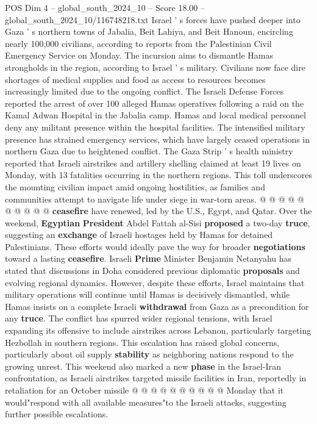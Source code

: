 \begin{textsample}{POS Dim 4 – global\_south\_2024\_10 – Score 18.00 – global\_south\_2024\_10/116748218.txt}  \label{ex:f4_pos_386}
Israel ' s forces have pushed deeper into Gaza ' s northern towns of Jabalia, Beit Lahiya, and Beit Hanoun, encircling nearly 100,000 civilians, according to reports from the Palestinian Civil Emergency Service on Monday.
The incursion aims to dismantle Hamas strongholds in the region, according to Israel ' s military.
Civilians now face dire shortages of medical supplies and food as access to resources becomes increasingly limited due to the ongoing conflict.
The Israeli Defense Forces reported the arrest of over 100 alleged Hamas operatives following a raid on the Kamal Adwan Hospital in the Jabalia camp.
Hamas and local medical personnel deny any militant presence within the hospital facilities.
The intensified military presence has strained emergency services, which have largely ceased operations in northern Gaza due to heightened conflict.
The Gaza Strip ' s health ministry reported that Israeli airstrikes and artillery shelling claimed at least 19 lives on Monday, with 13 fatalities occurring in the northern regions.
This toll underscores the mounting civilian impact amid ongoing hostilities, as families and communities attempt to navigate life under siege in war-torn areas. @ @ @ @ @ @ @ @ @ @ \textbf{ceasefire} have renewed, led by the U.S., Egypt, and Qatar.
Over the weekend, \textbf{Egyptian} \textbf{President} Abdel Fattah al-Sisi \textbf{proposed} a two-day \textbf{truce}, suggesting an \textbf{exchange} of Israeli hostages held by Hamas for detained Palestinians.
These efforts would ideally pave the way for broader \textbf{negotiations} toward a lasting \textbf{ceasefire}.
Israeli \textbf{Prime} Minister Benjamin Netanyahu has stated that discussions in Doha considered previous diplomatic \textbf{proposals} and evolving regional dynamics.
However, despite these efforts, Israel maintains that military operations will continue until Hamas is decisively dismantled, while Hamas insists on a complete Israeli \textbf{withdrawal} from Gaza as a precondition for any \textbf{truce}.
The conflict has spurred wider regional tensions, with Israel expanding its offensive to include airstrikes across Lebanon, particularly targeting Hezbollah in southern regions.
This escalation has raised global concerns, particularly about oil supply \textbf{stability} as neighboring nations respond to the growing unrest.
This weekend also marked a new \textbf{phase} in the Israel-Iran confrontation, as Israeli airstrikes targeted missile facilities in Iran, reportedly in retaliation for an October missile @ @ @ @ @ @ @ @ @ @ Monday that it would"respond with all available measures"to the Israeli attacks, suggesting further possible escalations.

\end{textsample}
